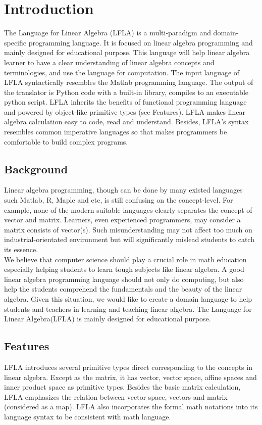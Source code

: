 \documentclass[12pt]{article} %
\begin{document}
\tableofcontents
\newpage

\section{Introduction}
\noindent The Language for Linear Algebra (LFLA) is a multi-paradigm and domain-specific programming language. It is focused on linear algebra programming and mainly designed for educational purpose. This language will help linear algebra learner to have a clear understanding of linear algebra concepts and terminologies, and use the language for computation. The input language of LFLA syntactically resembles the Matlab programming language. The output of the translator is Python code with a built-in library, compiles to an executable python script. LFLA inherits the benefits of functional programming language and powered by object-like primitive types (see Features). LFLA makes linear algebra calculation easy to code, read and understand. Besides, LFLA's syntax resembles common imperative languages so that makes programmers be comfortable to build complex programs.


\subsection{Background}
\noindent Linear algebra programming, though can be done by many existed languages such Matlab, R, Maple and etc, is still confusing on the concept-level. For example, none of the modern suitable languages clearly separates the concept of vector and matrix. Learners, even experienced programmers, may consider a matrix consists of vector(s). Such misunderstanding may not affect too much on industrial-orientated environment but will significantly mislead students to catch its essence. \\

\noindent We believe that computer science should play a crucial role in math education especially helping students to learn tough subjects like linear algebra. A good linear algebra programming language should not only do computing, but also help the students comprehend the fundamentals and the beauty of the linear algebra. Given this situation, we would like to create a domain language to help students and teachers in learning and teaching linear algebra. The Language for Linear Algebra(LFLA) is mainly designed for educational purpose.

\subsection{Features} 
\noindent LFLA introduces several primitive types direct corresponding to the concepts in linear algebra. Except as the matrix, it has vector, vector space, affine spaces and inner product space as primitive types. Besides the basic matrix calculation, LFLA emphasizes the relation between vector space, vectors and matrix (considered as a map). LFLA also incorporates the formal math notations into its language syntax to be consistent with math language.
\end{document}
